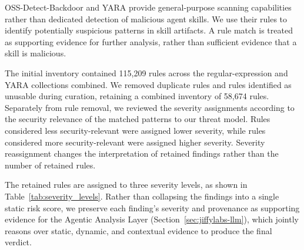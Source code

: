 OSS-Detect-Backdoor and YARA provide general-purpose
scanning capabilities rather than dedicated detection
of malicious agent skills. We use their rules to identify
potentially suspicious patterns in skill artifacts.
A rule match is treated as supporting evidence for
further analysis, rather than sufficient evidence
that a skill is malicious.

The initial inventory contained 115,209 rules across
the regular-expression and YARA collections combined.
We removed duplicate rules and rules identified as
unusable during curation, retaining a combined inventory
of 58,674 rules. Separately from rule removal, we reviewed
the severity assignments according to the security
relevance of the matched patterns to our threat model.
Rules considered less security-relevant were assigned
lower severity, while rules considered more
security-relevant were assigned higher severity.
Severity reassignment changes the interpretation of
retained findings rather than the number of retained rules.

The retained rules are assigned to three severity levels,
as shown in Table~\ref{tab:severity_levels}.
Rather than collapsing the findings into a single static
risk score, we preserve each finding's severity and
provenance as supporting evidence for the Agentic
Analysis Layer (Section~\ref{sec:jiffylabs-llm}),
which jointly reasons over static, dynamic, and
contextual evidence to produce the final verdict.





